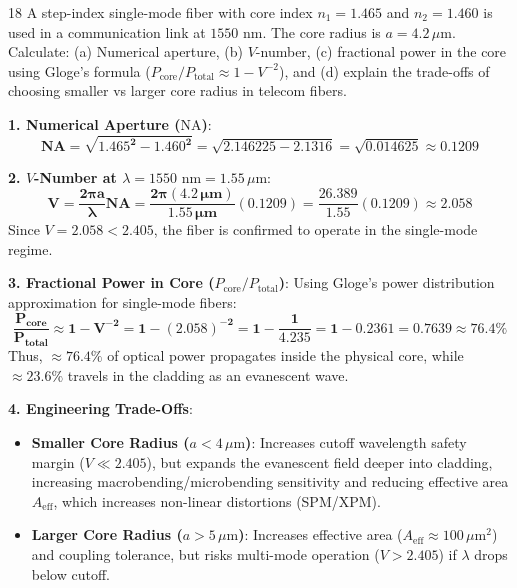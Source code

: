 \begin{theoryq}{18}
A step-index single-mode fiber with core index $n_1 = 1.465$ and $n_2 = 1.460$ is used in a communication link at $1550\text{ nm}$. The core radius is $a = 4.2\,\mu\text{m}$. Calculate: (a) Numerical aperture, (b) $V$-number, (c) fractional power in the core using Gloge's formula ($P_{\text{core}}/P_{\text{total}} \approx 1 - V^{-2}$), and (d) explain the trade-offs of choosing smaller vs larger core radius in telecom fibers.
\end{theoryq}
\begin{theorysol}
\textbf{1. Numerical Aperture ($\text{NA}$)}:
\begin{equation}
\mathbf{\text{NA} = \sqrt{1.465^2 - 1.460^2} = \sqrt{2.146225 - 2.1316} = \sqrt{0.014625} \approx 0.1209}
\end{equation}

\textbf{2. $V$-Number at $\lambda = 1550\text{ nm} = 1.55\,\mu\text{m}$}:
\begin{equation}
\mathbf{V = \frac{2\pi a}{\lambda}\text{NA} = \frac{2\pi (4.2\,\mu\text{m})}{1.55\,\mu\text{m}}(0.1209) = \frac{26.389}{1.55}(0.1209) \approx 2.058}
\end{equation}
Since $V = 2.058 < 2.405$, the fiber is confirmed to operate in the single-mode regime.

\textbf{3. Fractional Power in Core ($P_{\text{core}}/P_{\text{total}}$)}:
Using Gloge's power distribution approximation for single-mode fibers:
\begin{equation}
\mathbf{\frac{P_{\text{core}}}{P_{\text{total}}} \approx 1 - V^{-2} = 1 - (2.058)^{-2} = 1 - \frac{1}{4.235} = 1 - 0.2361 = 0.7639 \approx 76.4\%}
\end{equation}
Thus, $\approx 76.4\%$ of optical power propagates inside the physical core, while $\approx 23.6\%$ travels in the cladding as an evanescent wave.

\textbf{4. Engineering Trade-Offs}:
\begin{itemize}
    \item \textbf{Smaller Core Radius ($a < 4\,\mu\text{m}$)}:
    Increases cutoff wavelength safety margin ($V \ll 2.405$), but expands the evanescent field deeper into cladding, increasing macrobending/microbending sensitivity and reducing effective area $A_{\text{eff}}$, which increases non-linear distortions (SPM/XPM).
    \item \textbf{Larger Core Radius ($a > 5\,\mu\text{m}$)}:
    Increases effective area ($A_{\text{eff}} \approx 100\,\mu\text{m}^2$) and coupling tolerance, but risks multi-mode operation ($V > 2.405$) if $\lambda$ drops below cutoff.
\end{itemize}
\end{theorysol}
\vspace{4mm}

